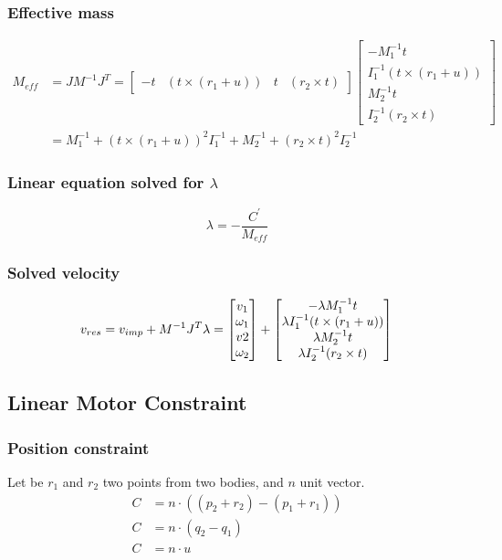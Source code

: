 \documentclass{article}
\begin{document}
	\subsubsection{Effective mass}
	\begin{align}
		M_{eff}
		&=JM^{-1}J^T=
		\begin{bmatrix}
			-t & (t\times(r_1+u)) & t & (r_2\times t)
		\end{bmatrix}
		\begin{bmatrix}
			-M_1^{-1}t\\
			I_1^{-1}(t\times(r_1+u))\\
			M_2^{-1}t\\
			I_2^{-1}(r_2\times t)
		\end{bmatrix}\\
		&=M_1^{-1}+(t\times(r_1+u))^2I_1^{-1}+M_2^{-1}+(r_2\times t)^2I_2^{-1}
	\end{align}
	\subsubsection{Linear equation solved for $\lambda$}
		$$
			\lambda=-\frac{C^{'}}{M_{eff}}
		$$
	\subsubsection{Solved velocity}
	$$
		v_{res}=v_{imp}+M^{-1}J^T\lambda=
		\begin{bmatrix}
			v_1\\
			\omega_1\\
			v2\\
			\omega_2
		\end{bmatrix}
		+
		\begin{bmatrix}
			-\lambda M_1^{-1}t\\
			\lambda I_1^{-1}(t\times(r_1+u))\\
			\lambda M_2^{-1}t\\
			\lambda I_2^{-1}(r_2\times t)
		\end{bmatrix}\\
	$$
	\newpage
		\subsection{Linear Motor Constraint}
		\subsubsection{Position constraint}
		Let be $r_1$ and $r_2$ two points from two bodies, and $n$ unit vector.
		\begin{align*}
			C &= n\cdot((p_2+r_2)-(p_1+r_1))\\
			C &= n\cdot(q_2-q_1)\\
			C &= n\cdot u
		\end{align*}
\end{document}
